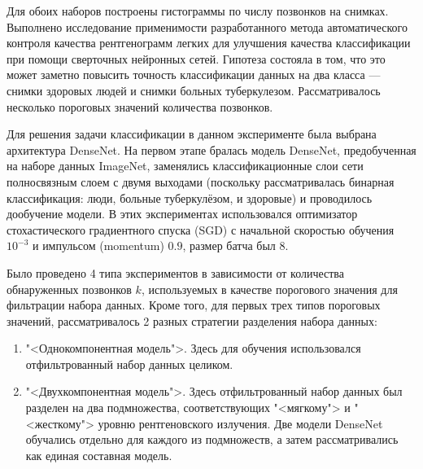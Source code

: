 Для обоих наборов построены гистограммы по числу позвонков на снимках. Выполнено исследование применимости разработанного метода автоматического контроля качества рентгенограмм легких для улучшения качества классификации при помощи сверточных нейронных сетей.  Гипотеза состояла в том, что это может заметно повысить точность классификации данных на два класса --- снимки здоровых людей и снимки больных туберкулезом. Рассматривалось несколько пороговых значений количества позвонков.

Для решения задачи классификации в данном эксперименте была выбрана архитектура DenseNet. На первом этапе бралась модель DenseNet, предобученная на наборе данных ImageNet, заменялись классификационные слои сети полносвязным слоем с двумя выходами (поскольку рассматривалась бинарная классификация: люди, больные туберкулёзом, и здоровые) и проводилось дообучение модели. В этих экспериментах использовался оптимизатор стохастического градиентного спуска (SGD) с начальной скоростью обучения $10^{- 3}$ и импульсом (momentum) $0.9$, размер батча был 8.

Было проведено 4 типа экспериментов в зависимости от количества обнаруженных позвонков $k$, используемых в качестве порогового значения для фильтрации набора данных. Кроме того, для первых трех типов пороговых значений, рассматривалось 2 разных стратегии разделения набора данных:

\begin {enumerate}
		\item	 "<Однокомпонентная модель">. Здесь для обучения использовался отфильтрованный набор данных целиком.
		\item	 "<Двухкомпонентная модель">. Здесь отфильтрованный набор данных был разделен на два подмножества, соответствующих "<мягкому"> и "<жесткому"> уровню рентгеновского излучения. Две модели DenseNet обучались отдельно для каждого из подмножеств, а затем рассматривались как единая составная модель.
\end {enumerate}

